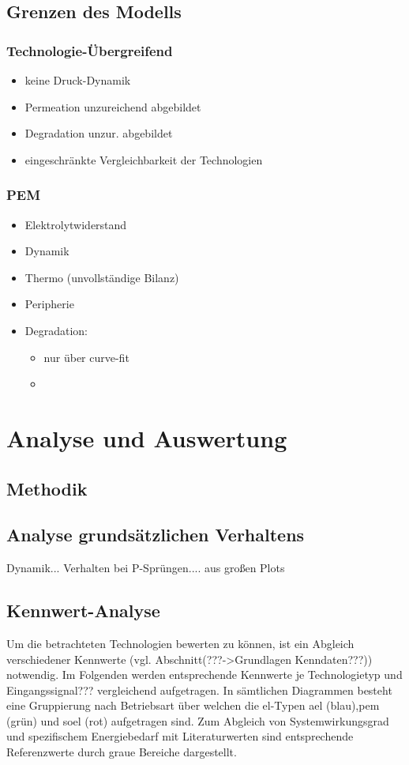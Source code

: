 \documentclass[onecolumn,10pt,titlepage]{article}
\begin{document}
\subsection{Grenzen des Modells}
\subsubsection{Technologie-Übergreifend}
\begin{itemize}
	\item keine Druck-Dynamik
	\item Permeation unzureichend abgebildet
	\item Degradation unzur. abgebildet
	\item eingeschränkte Vergleichbarkeit der Technologien
\end{itemize}

\subsubsection{PEM}
\begin{itemize}
	\item Elektrolytwiderstand
	\item Dynamik
	\item Thermo (unvollständige Bilanz)
	\item Peripherie
	\item Degradation:
	\begin{itemize}
		\item nur über curve-fit
		\item 
	\end{itemize}
\end{itemize}



\section{Analyse und Auswertung}
\subsection{Methodik}
\subsection{Analyse grundsätzlichen Verhaltens}
Dynamik... Verhalten bei P-Sprüngen....
aus großen Plots
\subsection{Kennwert-Analyse}
Um die betrachteten Technologien bewerten zu können, ist ein Abgleich verschiedener Kennwerte (vgl. Abschnitt(???->Grundlagen Kenndaten???)) notwendig. Im Folgenden werden entsprechende Kennwerte je Technologietyp und Eingangssignal??? vergleichend aufgetragen. In sämtlichen Diagrammen besteht eine Gruppierung nach Betriebsart über welchen die \gls{el}-Typen \gls{ael} (blau),\gls{pem} (grün) und \gls{soel} (rot) aufgetragen sind. Zum Abgleich von Systemwirkungsgrad und spezifischem Energiebedarf mit Literaturwerten sind entsprechende Referenzwerte durch graue Bereiche dargestellt.
\end{document}

